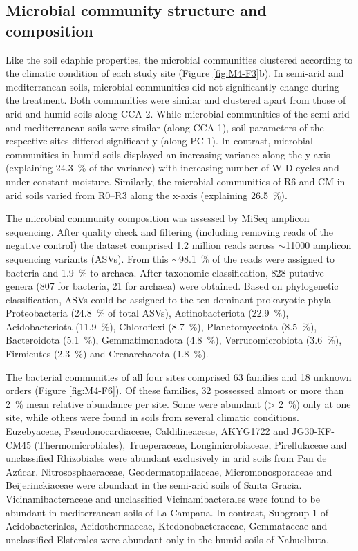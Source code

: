 \subsection{Microbial community structure and composition}

Like the soil edaphic properties, the microbial communities clustered according to the climatic condition of each study site (Figure \ref{fig:M4-F3}b). In semi-arid and mediterranean soils, microbial communities did not significantly change during the treatment. Both communities were similar and clustered apart from those of arid and humid soils along CCA 2. While microbial communities of the semi-arid and mediterranean soils were similar (along CCA 1), soil parameters of the respective sites differed significantly (along PC 1). In contrast, microbial communities in humid soils displayed an increasing variance along the y-axis (explaining \SI{24.3}{\percent} of the variance) with increasing number of W-D cycles and under constant moisture. Similarly, the microbial communities of R6 and CM in arid soils varied from R0--R3 along the x-axis (explaining \SI{26.5}{\percent}).

The microbial community composition was assessed by MiSeq amplicon sequencing. After quality check and filtering (including removing reads of the negative control) the dataset comprised 1.2 million reads across \(\sim\)\num{11000} amplicon sequencing variants (ASVs). From this \(\sim\)\SI{98.1}{\percent} of the reads were assigned to bacteria and \SI{1.9}{\percent} to archaea. After taxonomic classification, 828 putative genera (807 for bacteria, 21 for archaea) were obtained. Based on phylogenetic classification, ASVs could be assigned to the ten dominant prokaryotic phyla Proteobacteria (\SI{24.8}{\percent} of total ASVs), Actinobacteriota (\SI{22.9}{\percent}), Acidobacteriota (\SI{11.9}{\percent}), Chloroflexi (\SI{8.7}{\percent}), Planctomycetota (\SI{8.5}{\percent}), Bacteroidota (\SI{5.1}{\percent}), Gemmatimonadota (\SI{4.8}{\percent}), Verrucomicrobiota (\SI{3.6}{\percent}), Firmicutes (\SI{2.3}{\percent}) and Crenarchaeota (\SI{1.8}{\percent}).

The bacterial communities of all four sites comprised 63 families and 18 unknown orders (Figure \ref{fig:M4-F6}). 
Of these families, 32 possessed almost or more than \SI{2}{\percent} mean relative abundance per site. 
Some were abundant (\SI{> 2}{\percent}) only at one site, while others were found in soils from several climatic conditions. 
Euzebyaceae, Pseudonocardiaceae, Caldilineaceae, AKYG1722 and JG30-KF-CM45 (Thermomicrobiales), Trueperaceae, Longimicrobiaceae, Pirellulaceae and unclassified Rhizobiales were abundant exclusively in arid soils from Pan de Az{\'u}car. 
Nitrososphaeraceae, Geodermatophilaceae, Micromonosporaceae and Beijerinckiaceae were abundant in the semi-arid soils of Santa Gracia. 
Vicinamibacteraceae and unclassified Vicinamibacterales were found to be abundant in mediterranean soils of La Campana. 
In contrast, Subgroup 1 of Acidobacteriales, Acidothermaceae, Ktedonobacteraceae, Gemmataceae and unclassified Elsterales were abundant only in the humid soils of Nahuelbuta.


